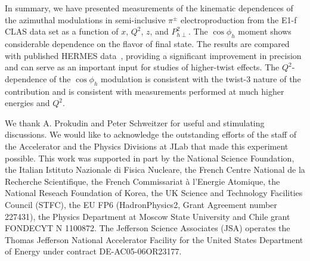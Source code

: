 \documentclass[aps,prl,twocolumn,showpacs,superscriptaddress,groupedaddress]{revtex4}  %
\newcommand{\Phperp}{P_{h\perp}}
\newcommand{\xbj}{x}
\begin{document}
 

In summary, we have presented measurements of the kinematic dependences of the azimuthal modulations in semi-inclusive $\pi ^\pm$ electroproduction from the E1-f CLAS data set as a function of $\xbj$, $Q^2$, $z$, and $\Phperp^2$.
The $\cos \phi_h$ moment shows considerable dependence on the flavor of final state. The results are compared with published HERMES data~\cite{Airapetian:2012yg}, 
providing  a significant improvement in precision and can serve as an important input for studies of higher-twist effects.
The  $Q^2$-dependence of the $\cos\phi_h$ modulation is consistent with 
the twist-3 nature of the contribution and is consistent with measurements performed at much higher energies and $Q^2$.

We thank A. Prokudin and Peter Schweitzer for useful and stimulating discussions.
We would like to acknowledge the outstanding efforts of the staff of the 
Accelerator and the Physics Divisions at JLab that made this experiment possible.
This work was supported in part by 
the National Science Foundation, 
the Italian Istituto Nazionale di Fisica Nucleare, 
the French Centre National de la Recherche Scientifique,
the French Commissariat \`{a} l'Energie Atomique, 
the National Reseach Foundation of Korea,
the UK Science and Technology Facilities Council (STFC),
the EU FP6 (HadronPhysics2, Grant Agreement number 227431),
the Physics Department at Moscow State University
and Chile grant FONDECYT N 1100872.
The Jefferson Science Associates (JSA) operates the Thomas Jefferson National Accelerator Facility for the United States Department of Energy under contract DE-AC05-06OR23177.
\end{document}

